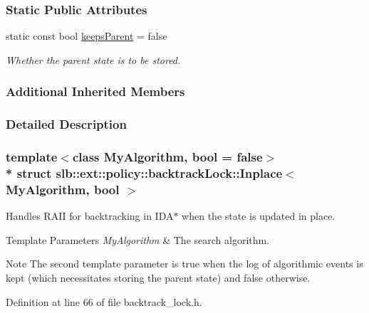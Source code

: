 \subsubsection*{Static Public Attributes}
\begin{DoxyCompactItemize}
\item 
static const bool \hyperlink{structslb_1_1ext_1_1policy_1_1backtrackLock_1_1Inplace_a5a7d3dfd27dbf3fecd5133837f2b63e3}{keeps\+Parent} = false\hypertarget{structslb_1_1ext_1_1policy_1_1backtrackLock_1_1Inplace_a5a7d3dfd27dbf3fecd5133837f2b63e3}{}\label{structslb_1_1ext_1_1policy_1_1backtrackLock_1_1Inplace_a5a7d3dfd27dbf3fecd5133837f2b63e3}

\begin{DoxyCompactList}\small\item\em Whether the parent state is to be stored. \end{DoxyCompactList}\end{DoxyCompactItemize}
\subsubsection*{Additional Inherited Members}


\subsubsection{Detailed Description}
\subsubsection*{template$<$class My\+Algorithm, bool = false$>$\\*
struct slb\+::ext\+::policy\+::backtrack\+Lock\+::\+Inplace$<$ My\+Algorithm, bool $>$}

Handles R\+A\+II for backtracking in I\+D\+A$\ast$ when the state is updated in place. 


\begin{DoxyTemplParams}{Template Parameters}
{\em My\+Algorithm} & The search algorithm. \\
\hline
\end{DoxyTemplParams}
\begin{DoxyNote}{Note}
The second template parameter is {\ttfamily true} when the log of algorithmic events is kept (which necessitates storing the parent state) and {\ttfamily false} otherwise. 
\end{DoxyNote}


Definition at line 66 of file backtrack\+\_\+lock.\+h.



